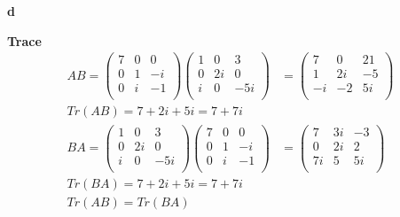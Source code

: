 \documentclass[10pt]{article} %
\begin{document}
\textbf{d}

\textbf{Trace}
\begin{align*}
  AB =
  \begin{pmatrix}
    7 & 0 & 0\\
    0 & 1 & -i\\
    0 & i & -1\\
  \end{pmatrix}
  \begin{pmatrix}
    1 & 0 & 3\\
    0 & 2i & 0\\
    i & 0 & -5i\\
  \end{pmatrix}
  &=
  \begin{pmatrix}
    7 & 0 & 21\\
    1 & 2i & -5\\
    -i & -2 & 5i\\
  \end{pmatrix}\\
  Tr(AB) = 7 + 2i + 5i = 7 + 7i\\
  BA =
  \begin{pmatrix}
    1 & 0 & 3\\
    0 & 2i & 0\\
    i & 0 & -5i\\
  \end{pmatrix}
  \begin{pmatrix}
    7 & 0 & 0\\
    0 & 1 & -i\\
    0 & i & -1\\
  \end{pmatrix}
  &=
  \begin{pmatrix}
    7 & 3i & -3\\
    0 & 2i & 2\\
    7i & 5 & 5i\\
  \end{pmatrix}\\
  Tr(BA) = 7 + 2i + 5i = 7 + 7i\\
  Tr(AB) = Tr(BA)\\
\end{align*}
\end{document}
